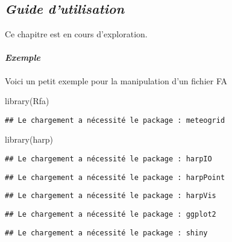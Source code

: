 \documentclass[
]{article}
\newenvironment{Shaded}{\begin{snugshade}}{\end{snugshade}}
\newcommand{\FunctionTok}[1]{\textcolor[rgb]{0.00,0.00,0.00}{#1}}
\newcommand{\NormalTok}[1]{#1}
\begin{document}
\hypertarget{guide-dutilisation}{%
\subsection{\texorpdfstring{\emph{Guide
d'utilisation}}{Guide d'utilisation}}\label{guide-dutilisation}}

Ce chapitre est en cours d'exploration.

\hypertarget{exemple}{%
\paragraph{\texorpdfstring{\emph{Exemple}}{Exemple}}\label{exemple}}

Voici un petit exemple pour la manipulation d'un fichier FA

\begin{Shaded}
\begin{Highlighting}[]
\FunctionTok{library}\NormalTok{(Rfa)}
\end{Highlighting}
\end{Shaded}

\begin{verbatim}
## Le chargement a nécessité le package : meteogrid
\end{verbatim}

\begin{Shaded}
\begin{Highlighting}[]
\FunctionTok{library}\NormalTok{(harp)}
\end{Highlighting}
\end{Shaded}

\begin{verbatim}
## Le chargement a nécessité le package : harpIO
\end{verbatim}

\begin{verbatim}
## Le chargement a nécessité le package : harpPoint
\end{verbatim}

\begin{verbatim}
## Le chargement a nécessité le package : harpVis
\end{verbatim}

\begin{verbatim}
## Le chargement a nécessité le package : ggplot2
\end{verbatim}

\begin{verbatim}
## Le chargement a nécessité le package : shiny
\end{verbatim}
\end{document}
